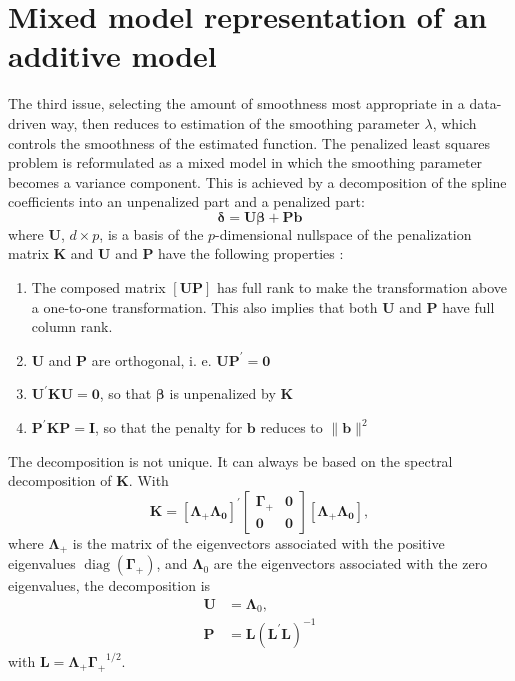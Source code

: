 \documentclass[12pt]{article}
\newcommand{\bmat}[1]{\left[\begin{array}{*{#1}{c}}}
\newcommand{\emat}{\end{array}\right]}
\newcommand{\tr}{^\prime}
\newcommand{\diag} {\operatorname{diag}}
\begin{document}
\section{Mixed model representation of an additive model} \label{Reparam}

The third issue, selecting the amount of smoothness most appropriate in a
data-driven way, then reduces to estimation of the smoothing parameter $\lambda$,
which controls the smoothness of the estimated function. The penalized least
squares problem is reformulated as a mixed model in which the smoothing parameter
becomes a variance component. This is achieved by a decomposition of the spline
coefficients into an unpenalized part and a penalized part: 
	\[ \bm \delta= \bm{U\beta} + \bm{Pb} \] 
where $\bm U$, $d \times p$, is a basis of the
$p$-dimensional nullspace of the penalization matrix $\bm K$ and $\bm U$ and
$\bm P$ have the following properties \citep[ch. 5.1]{Kneib:06}:
\begin{enumerate}
\item The composed matrix $[\bm U \bm P]$ has full rank to make the
transformation above a one-to-one transformation. This also implies that both
$\bm U$ and  $\bm P$ have full column rank.
\item  $\bm U$ and  $\bm P$ are orthogonal, i. e. $\bm U \bm P\tr = \bm 0$
\item $\bm{U\tr KU} = \bm 0 $, so that $\bm \beta$ is unpenalized by $\bm K$
\item $\bm{P\tr KP} = \bm I$, so that the penalty for $\bm b$ reduces to $\|\bm b\|^2$
\end{enumerate}
The decomposition is not unique. It can always be based on the spectral
decomposition of $\bm K$. With
 $$\bm K = [\bm{ \Lambda_+  \Lambda_0}]\tr \bmat{2} \bm{\Gamma_+} & \bm 0 \\ \bm
 0 & \bm 0\emat [\bm{ \Lambda_+  \Lambda_0}],$$
where $\bm \Lambda_+$ is the matrix of the eigenvectors associated with the
positive eigenvalues $\diag(\bm{\Gamma_+})$, and $\bm \Lambda_0$ are the
eigenvectors associated with the zero eigenvalues, the decomposition is
\begin{align*}
\bm{U} &= \bm \Lambda_0, \\
\bm{P} &= \bm L(\bm{L\tr L})^{-1} 
\end{align*}
with $\bm{L} = \bm \Lambda_+ \bm{\Gamma_+}^{1/2}$.
\end{document}

